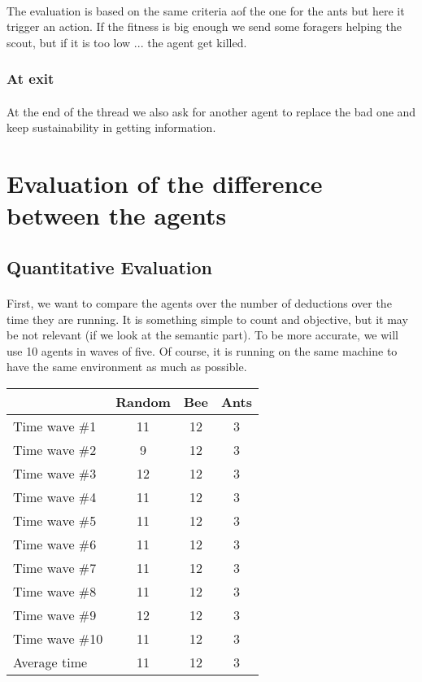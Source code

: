 \documentclass{article}
\begin{document}
			\paragraph{}
			The evaluation is based on the same criteria aof the one for the ants but here it trigger an action.
			If the fitness is big enough we send some foragers helping the scout, but if it is too low ... the agent get killed.
		\subsubsection{At exit}
			\paragraph{}
			At the end of the thread we also ask for another agent to replace the bad one and keep sustainability in getting information.
			
\section{Evaluation of the difference between the agents}
	\subsection{Quantitative Evaluation}
		\paragraph{}
			First, we want to compare the agents over the number of deductions over the time they are running.
			It is something simple to count and objective, but it may be not relevant (if we look at the semantic part).
			To be more accurate, we will use 10 agents in waves of five.	%
			Of course, it is running on the same machine to have the same environment as much as possible.
		\begin{center}
			\begin{tabular}{|l|c|c|c|}
				\hline
				& Random & Bee & Ants\\
				\hline
				Time wave \#1 & 11 & 12 & 3 \\
				Time wave \#2 & 9  & 12 & 3 \\
				Time wave \#3 & 12 & 12 & 3 \\
				Time wave \#4 & 11 & 12 & 3 \\
				Time wave \#5 & 11 & 12 & 3 \\
				Time wave \#6 & 11 & 12 & 3 \\
				Time wave \#7 & 11 & 12 & 3 \\
				Time wave \#8 & 11 & 12 & 3 \\
				Time wave \#9 & 12 & 12 & 3 \\
				Time wave \#10& 11 & 12 & 3 \\
				\hline
				Average time  & 11 & 12 & 3 \\
				\hline
			\end{tabular}
		\end{center}
\end{document}

